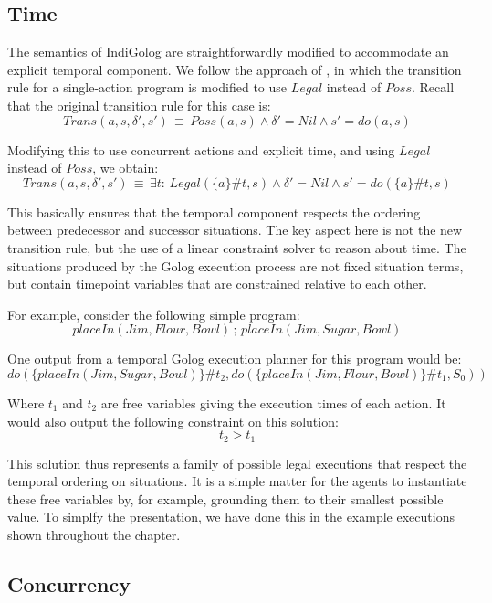 \subsection{Time}

The semantics of IndiGolog are straightforwardly modified to accommodate
an explicit temporal component. We follow the approach of \citep{Reiter98seq_temp_golog,reiter01kia},
in which the transition rule for a single-action program is modified
to use $Legal$ instead of $Poss$. Recall that the original transition
rule for this case is:\[
Trans(a,s,\delta',s')\,\equiv\, Poss(a,s)\wedge\delta'=Nil\wedge s'=do(a,s)\]


Modifying this to use concurrent actions and explicit time, and using
$Legal$ instead of $Poss$, we obtain:\begin{equation}
Trans(a,s,\delta',s')\,\equiv\,\exists t:\, Legal(\{a\}\#t,s)\wedge\delta'=Nil\wedge s'=do(\{a\}\#t,s)\label{eq:MIndiGolog:temp_trans_a}\end{equation}


This basically ensures that the temporal component respects the ordering
between predecessor and successor situations. The key aspect here
is not the new transition rule, but the use of a linear constraint
solver to reason about time. The situations produced by the Golog
execution process are not fixed situation terms, but contain timepoint
variables that are constrained relative to each other.

For example, consider the following simple program:\[
placeIn(Jim,Flour,Bowl)\,;\, placeIn(Jim,Sugar,Bowl)\]


One output from a temporal Golog execution planner for this program
would be:\[
do(\{placeIn(Jim,Sugar,Bowl)\}\#t_{2},do(\{placeIn(Jim,Flour,Bowl)\}\#t_{1},S_{0}))\]


Where $t_{1}$ and $t_{2}$ are free variables giving the execution
times of each action. It would also output the following constraint
on this solution:\[
t_{2}>t_{1}\]


This solution thus represents a family of possible legal executions
that respect the temporal ordering on situations. It is a simple matter
for the agents to instantiate these free variables by, for example,
grounding them to their smallest possible value. To simplfy the presentation,
we have done this in the example executions shown throughout the chapter.


\subsection{Concurrency}

